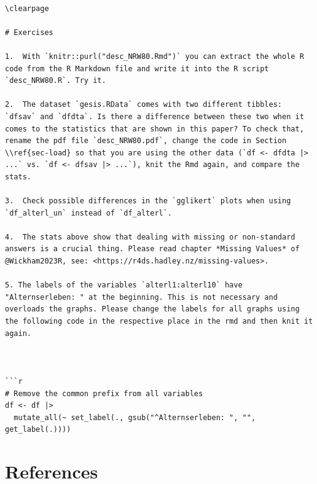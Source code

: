 \documentclass[
  doc]{apa6}
\begin{document}
\begin{verbatim}

\clearpage

# Exercises

1.  With `knitr::purl("desc_NRW80.Rmd")` you can extract the whole R code from the R Markdown file and write it into the R script `desc_NRW80.R`. Try it.

2.  The dataset `gesis.RData` comes with two different tibbles: `dfsav` and `dfdta`. Is there a difference between these two when it comes to the statistics that are shown in this paper? To check that, rename the pdf file `desc_NRW80.pdf`, change the code in Section \\ref{sec-load} so that you are using the other data (`df <- dfdta |> ...` vs. `df <- dfsav |> ...`), knit the Rmd again, and compare the stats.

3.  Check possible differences in the `gglikert` plots when using `df_alterl_un` instead of `df_alterl`.

4.  The stats above show that dealing with missing or non-standard answers is a crucial thing. Please read chapter *Missing Values* of @Wickham2023R, see: <https://r4ds.hadley.nz/missing-values>.

5. The labels of the variables `alterl1:alterl10` have "Alternserleben: " at the beginning. This is not necessary and overloads the graphs. Please change the labels for all graphs using the following code in the respective place in the rmd and then knit it again.



```r
# Remove the common prefix from all variables
df <- df |> 
  mutate_all(~ set_label(., gsub("^Alternserleben: ", "", get_label(.))))
\end{verbatim}

\clearpage

\hypertarget{references}{%
\section*{References}\label{references}}
\end{document}
